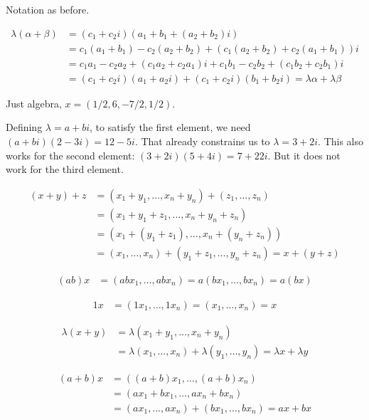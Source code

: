 \documentclass{article}
\begin{document}

Notation as before.

\begin{align*}
\lambda(\alpha + \beta) & = (c_1 + c_2i)(a_1 + b_1 + (a_2 + b_2)i) \\
                        & = c_1(a_1 + b_1) - c_2(a_2 + b_2) + (c_1(a_2 + b_2) + c_2(a_1 + b_1))i \\
                        & = c_1a_1 - c_2a_2 + (c_1a_2 + c_2a_1)i + c_1b_1 - c_2b_2 + (c_1b_2 + c_2b_1)i \\
                        & = (c_1 + c_2i)(a_1 + a_2i) + (c_1 + c_2i)(b_1 + b_2i) = \lambda\alpha + \lambda\beta
\end{align*}


Just algebra, $x = (1/2, 6, -7/2, 1/2)$.


Defining $\lambda = a + bi$, to satisfy the first element, we need $(a+bi)(2-3i)
= 12-5i$. That already constrains us to $\lambda = 3 + 2i$. This also works for
the second element: $(3 + 2i)(5 + 4i) = 7 + 22i$. But it does not work for the
third element.


\begin{align*}
(x + y) + z & = (x_1 + y_1, \ldots, x_n + y_n) + (z_1, \ldots, z_n) \\
            & = (x_1 + y_1 + z_1, \ldots, x_n + y_n + z_n) \\
            & = (x_1 + (y_1 + z_1), \ldots, x_n + (y_n + z_n)) \\
            & = (x_1, \ldots, x_n) + (y_1 + z_1, \ldots, y_n + z_n) = x + (y + z)
\end{align*}


\begin{align*}
(ab)x & = (abx_1, \ldots, abx_n) = a(bx_1, \ldots, bx_n) = a(bx)
\end{align*}


\begin{align*}
1x & = (1x_1, \ldots, 1x_n) = (x_1, \ldots, x_n) = x
\end{align*}


\begin{align*}
\lambda(x+y) & = \lambda(x_1 + y_1, \ldots, x_n + y_n) \\
             & = \lambda(x_1, \ldots, x_n) + \lambda(y_1, \ldots, y_n) = \lambda x + \lambda y
\end{align*}


\begin{align*}
(a+b)x & = ((a+b)x_1, \ldots, (a+b)x_n) \\
       & = (ax_1 + bx_1, \ldots, ax_n + bx_n) \\
       & = (ax_1, \ldots, ax_n) + (bx_1, \ldots, bx_n) = ax + bx
\end{align*}
\end{document}
